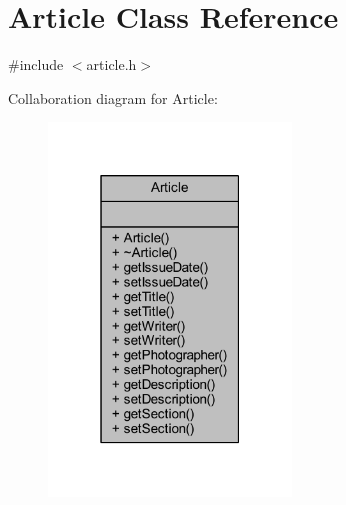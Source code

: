 \hypertarget{class_article}{}\section{Article Class Reference}
\label{class_article}


{\ttfamily \#include $<$article.\+h$>$}



Collaboration diagram for Article\+:
\nopagebreak
\begin{figure}[H]
\begin{center}
\leavevmode
\includegraphics[width=183pt]{class_article__coll__graph}
\end{center}
\end{figure}
